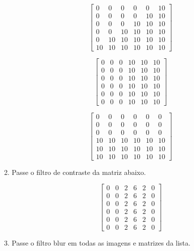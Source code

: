 \documentclass[12pt]{article}
\begin{document}
\begin{enumerate}
\[
\begin{bmatrix}
  0 &  0 &  0 &  0 &  0 & 10 \\
  0 &  0 &  0 &  0 & 10 & 10 \\
  0 &  0 &  0 & 10 & 10 & 10 \\
  0 &  0 & 10 & 10 & 10 & 10 \\
  0 & 10 & 10 & 10 & 10 & 10 \\
 10 & 10 & 10 & 10 & 10 & 10 
\end{bmatrix}
\]

\[
\begin{bmatrix}
  0 &  0 &  0 & 10 & 10 & 10 \\
  0 &  0 &  0 & 10 & 10 & 10 \\
  0 &  0 &  0 & 10 & 10 & 10 \\
  0 &  0 &  0 & 10 & 10 & 10 \\
  0 &  0 &  0 & 10 & 10 & 10 \\
  0 &  0 &  0 & 10 & 10 & 10 
\end{bmatrix}
\]

\[
\begin{bmatrix}
  0 &  0 &  0 &  0 &  0 &  0 \\
  0 &  0 &  0 &  0 &  0 &  0 \\
  0 &  0 &  0 &  0 &  0 &  0 \\
 10 & 10 & 10 & 10 & 10 & 10 \\
 10 & 10 & 10 & 10 & 10 & 10 \\
 10 & 10 & 10 & 10 & 10 & 10 
\end{bmatrix}
\]

\break

\item Passe o filtro de contraste da matriz abaixo.


\[
\begin{bmatrix}
  0 &  0 &  2 &  6 &  2 &  0 \\
  0 &  0 &  2 &  6 &  2 &  0 \\
  0 &  0 &  2 &  6 &  2 &  0 \\
  0 &  0 &  2 &  6 &  2 &  0 \\
  0 &  0 &  2 &  6 &  2 &  0 \\
  0 &  0 &  2 &  6 &  2 &  0 
\end{bmatrix}
\]

\item Passe o filtro blur em todas as imagens e matrizes da lista.


\end{enumerate}
\end{document}
